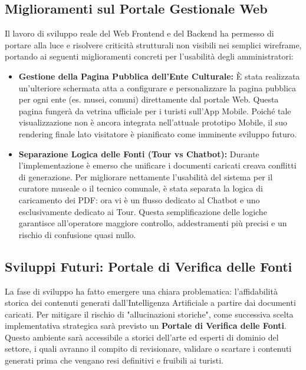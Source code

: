 \subsection{Miglioramenti sul Portale Gestionale Web}
Il lavoro di sviluppo reale del Web Frontend e del Backend ha permesso di portare alla luce e risolvere criticità strutturali non visibili nei semplici wireframe, portando ai seguenti miglioramenti concreti per l'usabilità degli amministratori:
\begin{itemize}
    \item \textbf{Gestione della Pagina Pubblica dell'Ente Culturale:} È stata realizzata un'ulteriore schermata atta a configurare e personalizzare la pagina pubblica per ogni ente (es. musei, comuni) direttamente dal portale Web. Questa pagina fungerà da vetrina ufficiale per i turisti sull'App Mobile. Poiché tale visualizzazione non è ancora integrata nell'attuale prototipo Mobile, il suo rendering finale lato visitatore è pianificato come imminente sviluppo futuro.
    \item \textbf{Separazione Logica delle Fonti (Tour vs Chatbot):} Durante l'implementazione è emerso che unificare i documenti caricati creava conflitti di generazione. Per migliorare nettamente l'usabilità del sistema per il curatore museale o il tecnico comunale, è stata separata la logica di caricamento dei PDF: ora vi è un flusso dedicato al Chatbot e uno esclusivamente dedicato ai Tour. Questa semplificazione delle logiche garantisce all'operatore maggiore controllo, addestramenti più precisi e un rischio di confusione quasi nullo.
\end{itemize}

\subsection{Sviluppi Futuri: Portale di Verifica delle Fonti}
La fase di sviluppo ha fatto emergere una chiara problematica: l'affidabilità storica dei contenuti generati dall'Intelligenza Artificiale a partire dai documenti caricati. 
Per mitigare il rischio di "allucinazioni storiche", come successiva scelta implementativa strategica sarà previsto un \textbf{Portale di Verifica delle Fonti}. Questo ambiente sarà accessibile a storici dell'arte ed esperti di dominio del settore, i quali avranno il compito di revisionare, validare o scartare i contenuti generati prima che vengano resi definitivi e fruibili ai turisti.
